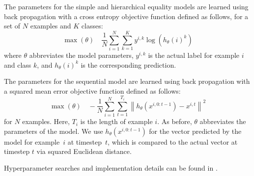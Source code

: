 {The parameters for the simple and hierarchical equality models are learned using back propagation with a cross entropy objective function defined as follows, for a set of $N$ examples and $K$ classes:
%
\begin{equation}\label{eq:crossent}
\max(\theta)
\quad
\frac{1}{N}
\sum_{i=1}^{N}
\sum_{k=1}^{K}
y^{i,k} \log(h_{\theta}(i)^{k})
\end{equation}
%
where $\theta$ abbreviates the model parameters, $y^{i,k}$ is the actual label for example $i$ and class $k$, and $h_{\theta}(i)^{k}$ is the corresponding prediction.

The parameters for the sequential model are learned using back propagation with a squared mean error objective function defined as follows:
%
\begin{equation}
\max(\theta)
\quad
-\frac{1}{N}
\sum_{i=1}^{N}
\sum_{t=1}^{T_{i}}
\left\| h_{\theta}\left(x^{i, 0:{t-1}}\right) - x^{i,t} \right\|^{2}
\end{equation}
%
for $N$ examples. Here, $T_{i}$ is the length of example $i$. As before, $\theta$ abbreviates the parameters of the model. We use $h_{\theta}(x^{i, 0:{t-1}})$ for the vector predicted by the model for example~$i$ at timestep~$t$, which is compared to the actual vector at timestep $t$ via squared Euclidean distance.

Hyperparameter searches and implementation details can be found in .

}

\showmatmethods{} %

\acknow{}

\showacknow{} %





